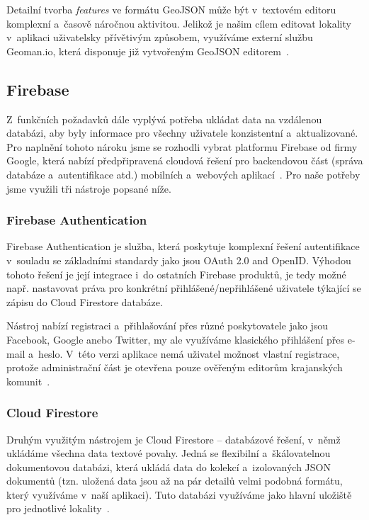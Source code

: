 Detailní tvorba \emph{features} ve formátu GeoJSON může být v~textovém editoru komplexní a~časově náročnou aktivitou. Jelikož je našim cílem editovat lokality v~aplikaci uživatelsky přívětivým způsobem, využíváme externí službu Geoman.io, která disponuje již vytvořeným GeoJSON editorem~\parencite{geoman}.

\hypertarget{firebase}{%
\subsection{Firebase}\label{firebase}}

Z~funkčních požadavků dále vyplývá potřeba ukládat data na vzdálenou databázi, aby byly informace pro všechny uživatele konzistentní a~aktualizované. Pro naplnění tohoto nároku jsme se rozhodli vybrat platformu Firebase od firmy Google, která nabízí předpřipravená cloudová řešení pro backendovou část (správa databáze a~autentifikace atd.) mobilních a~webových aplikací~\parencite{firebase}. Pro naše potřeby jsme využili tři nástroje popsané níže.

\hypertarget{firebase-authentication}{%
\subsubsection{Firebase Authentication}\label{firebase-authentication}}

Firebase Authentication je služba, která poskytuje komplexní řešení autentifikace v~souladu se základními standardy jako jsou OAuth 2.0 and OpenID. Výhodou tohoto řešení je její integrace i~do ostatních Firebase produktů, je tedy možné např. nastavovat práva pro konkrétní přihlášené/nepřihlášené uživatele týkající se zápisu do Cloud Firestore databáze.

Nástroj nabízí registraci a~přihlašování přes různé poskytovatele jako jsou Facebook, Google anebo Twitter, my ale využíváme klasického přihlášení přes e-mail a~heslo. V~této verzi aplikace nemá uživatel možnost vlastní registrace, protože administrační část je otevřena pouze ověřeným editorům krajanských komunit~\parencite{auth}.

\hypertarget{cloud-firestore}{%
\subsubsection{Cloud Firestore}\label{cloud-firestore}}

Druhým využitým nástrojem je Cloud Firestore -- databázové řešení, v~němž ukládáme všechna data textové povahy. Jedná se flexibilní a~škálovatelnou dokumentovou databázi, která ukládá data do kolekcí a~izolovaných JSON dokumentů (tzn. uložená data jsou až na pár detailů velmi podobná formátu, který využíváme v~naší aplikaci). Tuto databázi využíváme jako hlavní uložiště pro jednotlivé lokality~\parencite{firestore}.

